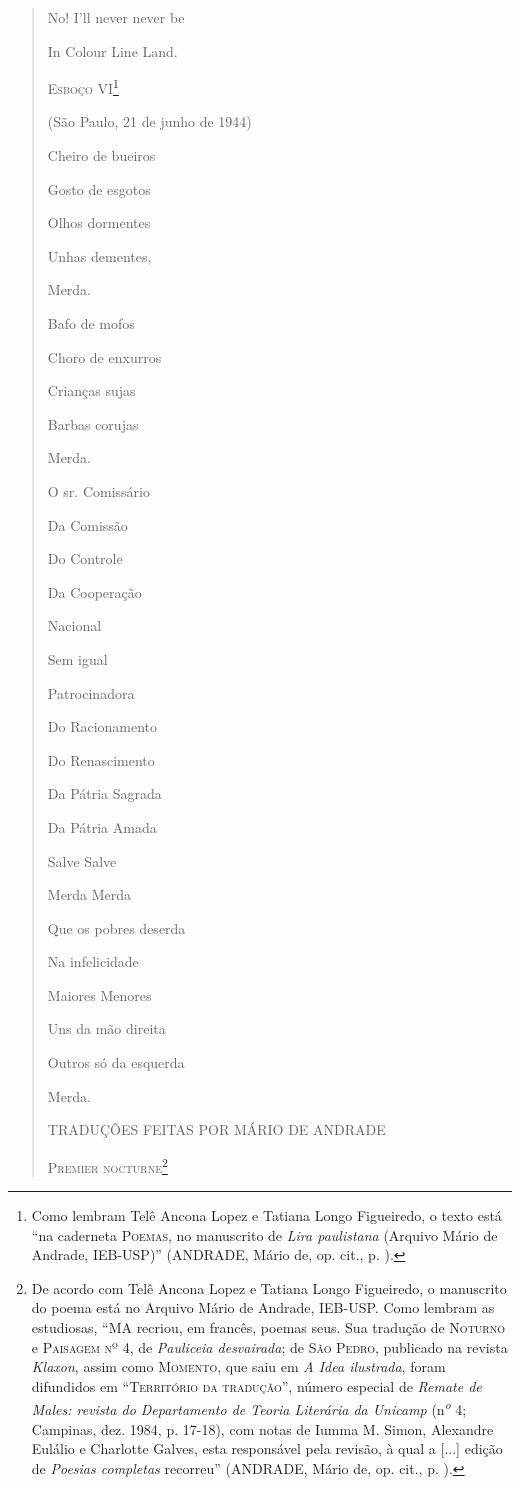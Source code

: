 \begin{verse}
No! I'll never never be

In Colour Line Land.

\textsc{Esboço VI}\footnote{Como lembram Telê Ancona Lopez e Tatiana
  Longo Figueiredo, o texto está ``na caderneta \textsc{Poemas}, no
  manuscrito de \emph{Lira paulistana} (Arquivo Mário de Andrade,
  IEB-USP)'' (ANDRADE, Mário de, op. cit., p. ).}

(São Paulo, 21 de junho de 1944)

Cheiro de bueiros

Gosto de esgotos

Olhos dormentes

Unhas dementes,

Merda.

Bafo de mofos

Choro de enxurros

Crianças sujas

Barbas corujas

Merda.

O sr. Comissário

Da Comissão

Do Controle

Da Cooperação

Nacional

Sem igual

Patrocinadora

Do Racionamento

Do Renascimento

Da Pátria Sagrada

Da Pátria Amada

Salve Salve

Merda Merda

Que os pobres deserda

Na infelicidade

Maiores Menores

Uns da mão direita

Outros só da esquerda

Merda.

\textsc{TRADUÇÕES FEITAS POR MÁRIO DE ANDRADE}

\textsc{Premier nocturne}\footnote{De acordo com Telê Ancona Lopez e
  Tatiana Longo Figueiredo, o manuscrito do poema está no Arquivo Mário
  de Andrade, IEB-USP. Como lembram as estudiosas, ``MA recriou, em
  francês, poemas seus. Sua tradução de \textsc{Noturno} e
  \textsc{Paisagem nº 4,} de \emph{Pauliceia desvairada}; de \textsc{São
  Pedro,} publicado na revista \emph{Klaxon}, assim como
  \textsc{Momento}, que saiu em \emph{A Idea ilustrada}, foram
  difundidos em ``\textsc{Território da tradução}'', número especial de
  \emph{Remate de Males: revista do Departamento de Teoria Literária da
  Unicamp} (n\textsuperscript{\emph{o}} 4; Campinas, dez. 1984, p.
  17-18), com notas de Iumma M. Simon, Alexandre Eulálio e Charlotte
  Galves, esta responsável pela revisão, à qual a {[}...{]} edição de
  \emph{Poesias completas} recorreu'' (ANDRADE, Mário de, op. cit., p.
  ).}


\end{verse}
